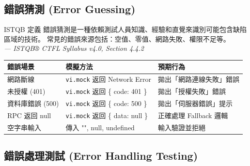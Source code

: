 \documentclass[11pt, a4paper]{article}
\begin{document}
\subsection{錯誤猜測 (Error Guessing)}

\begin{calloutbox}{ISTQB 定義}
  錯誤猜測是一種依賴測試人員知識、經驗和直覺來識別可能包含缺陷區域的技術。
  常見的錯誤來源包括：空值、零值、網路失敗、權限不足等。\\
  \textit{--- ISTQB® CTFL Syllabus v4.0, Section 4.4.2}
\end{calloutbox}

\begin{center}
  \renewcommand{\arraystretch}{1.4}
  \begin{tabular}{p{} p{} p{}}
    \toprule
    \textbf{錯誤場景}                    & \textbf{模擬方法}                        & \textbf{預期行為}    \\
    \midrule
    網路斷線                             & \texttt{vi.mock} 返回 Network Error    & 拋出「網路連線失敗」錯誤     \\
    \rowcolor{LightGray} 未授權 (401)   & \texttt{vi.mock} 返回 \{ code: 401 \}  & 拋出「授權失敗」錯誤       \\
    資料庫錯誤 (500)                      & \texttt{vi.mock} 返回 \{ code: 500 \}  & 拋出「伺服器錯誤」提示      \\
    \rowcolor{LightGray} RPC 返回 null & \texttt{vi.mock} 返回 \{ data: null \} & 正確處理 Fallback 邏輯 \\
    空字串輸入                            & 傳入 "", null, undefined               & 輸入驗證並拒絕          \\
    \bottomrule
  \end{tabular}
\end{center}

\subsection{錯誤處理測試 (Error Handling Testing)}
\end{document}
